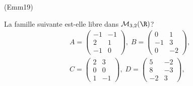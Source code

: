 \begin{tiny}(Emm19)\end{tiny} La famille suivante est-elle libre dans $\mathcal{M}_{3,2}(\R)$?
\begin{multline*}
A= 
\begin{pmatrix}
  -1 & -1 \\ 2 & 1 \\ -1 & 0
\end{pmatrix},\;
B= 
\begin{pmatrix}
  0 & 1 \\ -1 & 3 \\ 0 & -2
\end{pmatrix},\; \\
C= 
\begin{pmatrix}
  2 & 3 \\ 0 & 0 \\ 1 & -1
\end{pmatrix},\;
D= 
\begin{pmatrix}
  5 & -2 \\ 8 & -3 \\ -2 & 3
\end{pmatrix},\;
\end{multline*}
